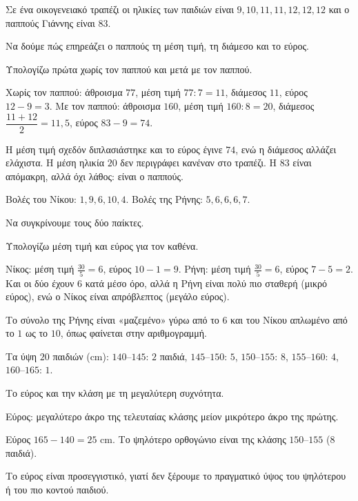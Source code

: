 \tixero Σε ένα οικογενειακό τραπέζι οι ηλικίες των παιδιών είναι $9, 10, 11, 11, 12, 12, 12$ και ο παππούς Γιάννης είναι $83$.\par
\tithelo Να δούμε πώς επηρεάζει ο παππούς τη μέση τιμή, τη διάμεσο και το εύρος.\par
\possindeo Υπολογίζω πρώτα χωρίς τον παππού και μετά με τον παππού.\par
\apantisi Χωρίς τον παππού: άθροισμα $77$, μέση τιμή $77:7=11$, διάμεσος $11$, εύρος $12-9=3$. Με τον παππού: άθροισμα $160$, μέση τιμή $160:8=20$, διάμεσος $\dfrac{11+12}{2}=11{,}5$, εύρος $83-9=74$.\par
\elegxos Η μέση τιμή σχεδόν διπλασιάστηκε και το εύρος έγινε $74$, ενώ η διάμεσος αλλάζει ελάχιστα. Η μέση ηλικία $20$ δεν περιγράφει κανέναν στο τραπέζι. Η $83$ είναι απόμακρη, αλλά όχι λάθος: είναι ο παππούς.

\tixero Βολές του Νίκου: $1,9,6,10,4$. Βολές της Ρήνης: $5,6,6,6,7$.\par
\tithelo Να συγκρίνουμε τους δύο παίκτες.\par
\possindeo Υπολογίζω μέση τιμή και εύρος για τον καθένα.\par
\apantisi Νίκος: μέση τιμή $\frac{30}{5}=6$, εύρος $10-1=9$. Ρήνη: μέση τιμή $\frac{30}{5}=6$, εύρος $7-5=2$. Και οι δύο έχουν $6$ κατά μέσο όρο, αλλά η Ρήνη είναι πολύ πιο σταθερή (μικρό εύρος), ενώ ο Νίκος είναι απρόβλεπτος (μεγάλο εύρος).\par
\elegxos Το σύνολο της Ρήνης είναι «μαζεμένο» γύρω από το $6$ και του Νίκου απλωμένο από το $1$ ως το $10$, όπως φαίνεται στην αριθμογραμμή.

\tixero Τα ύψη $20$ παιδιών (cm): $140$--$145$: $2$ παιδιά, $145$--$150$: $5$, $150$--$155$: $8$, $155$--$160$: $4$, $160$--$165$: $1$.\par
\tithelo Το εύρος και την κλάση με τη μεγαλύτερη συχνότητα.\par
\possindeo Εύρος: μεγαλύτερο άκρο της τελευταίας κλάσης μείον μικρότερο άκρο της πρώτης.\par
\apantisi Εύρος $165-140=25$ cm. Το ψηλότερο ορθογώνιο είναι της κλάσης $150$--$155$ ($8$ παιδιά).\par
\elegxos Το εύρος είναι προσεγγιστικό, γιατί δεν ξέρουμε το πραγματικό ύψος του ψηλότερου ή του πιο κοντού παιδιού.



